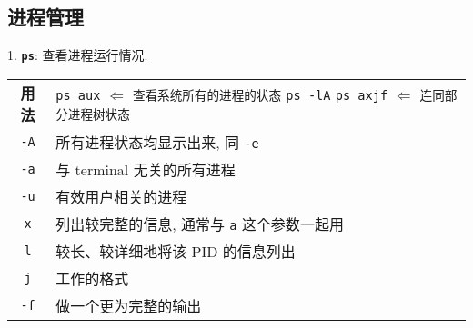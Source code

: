\subsection{进程管理}
\par
1. \textbf{\texttt{ps}}: 查看进程运行情况.
\begin{longtable}{c@{ : }p{}}\hline\hline

    \textbf{用法} & \verb"ps aux" \quad$\Longleftarrow$ \texttt{查看系统所有的进程的状态}\newline
                    \verb"ps -lA" \newline
                    \verb"ps axjf" \quad$\Longleftarrow$ \texttt{连同部分进程树状态}\\

    \texttt{-A} & 所有进程状态均显示出来, 同 \texttt{-e}\\

    \texttt{-a} & 与 terminal 无关的所有进程\\

    \texttt{-u} & 有效用户相关的进程\\

    \texttt{x} & 列出较完整的信息, 通常与 \texttt{a} 这个参数一起用\\

    \texttt{l} & 较长、较详细地将该 PID 的信息列出\\

    \texttt{j} & 工作的格式\\

    \texttt{-f} & 做一个更为完整的输出\\

    \hline
\end{longtable}


